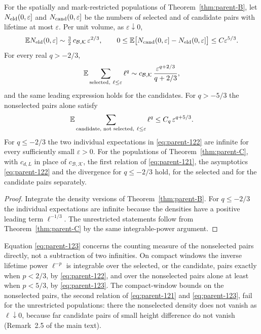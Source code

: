 \begin{corollary}\label{cor:parent-moments}
For the spatially and mark-restricted populations of Theorem~\ref{thm:parent-B}, let $N_{\mathrm{eld}}(0,\varepsilon]$ and $N_{\mathrm{cand}}(0,\varepsilon]$ be the numbers of selected and of candidate pairs with lifetime at most $\varepsilon$. Per unit volume, as $\varepsilon\downarrow0$,
\begin{equation}\label{eq:parent-121}
\mathbb E N_{\mathrm{eld}}(0,\varepsilon]\sim\tfrac32\,c_{\mathcal B,\mathcal K}\,\varepsilon^{2/3},\qquad 0\le\mathbb E\bigl[N_{\mathrm{cand}}(0,\varepsilon]-N_{\mathrm{eld}}(0,\varepsilon]\bigr]\le C\varepsilon^{5/3}.
\end{equation}
For every real $q>-2/3$,
\begin{equation}\label{eq:parent-122}
\mathbb E\sum_{\text{selected},\ \ell\le\varepsilon}\ell^q\sim c_{\mathcal B,\mathcal K}\,\frac{\varepsilon^{q+2/3}}{q+2/3},
\end{equation}
and the same leading expression holds for the candidates. For $q>-5/3$ the nonselected pairs alone satisfy
\begin{equation}\label{eq:parent-123}
\mathbb E\sum_{\text{candidate, not selected},\ \ell\le\varepsilon}\ell^q\le C_q\,\varepsilon^{q+5/3}.
\end{equation}
For $q\le-2/3$ the two individual expectations in \eqref{eq:parent-122} are infinite for every sufficiently small $\varepsilon>0$. For the populations of Theorem~\ref{thm:parent-C}, with $c_{d,L}$ in place of $c_{\mathcal B,\mathcal K}$, the first relation of \eqref{eq:parent-121}, the asymptotics \eqref{eq:parent-122} and the divergence for $q\le-2/3$ hold, for the selected and for the candidate pairs separately.
\end{corollary}

\begin{proof}
Integrate the density versions of Theorem~\ref{thm:parent-B}. For $q\le-2/3$ the individual expectations are infinite because the densities have a positive leading term $\ell^{-1/3}$. The unrestricted statements follow from Theorem~\ref{thm:parent-C} by the same integrable-power argument.
\end{proof}

Equation \eqref{eq:parent-123} concerns the counting measure of the nonselected pairs directly, not a subtraction of two infinities. On compact windows the inverse lifetime power $\ell^{-p}$ is integrable over the selected, or the candidate, pairs exactly when $p<2/3$, by \eqref{eq:parent-122}, and over the nonselected pairs alone at least when $p<5/3$, by \eqref{eq:parent-123}. The compact-window bounds on the nonselected pairs, the second relation of \eqref{eq:parent-121} and \eqref{eq:parent-123}, fail for the unrestricted populations: there the nonselected density does not vanish as $\ell\downarrow0$, because far candidate pairs of small height difference do not vanish (Remark~2.5 of the main text).

